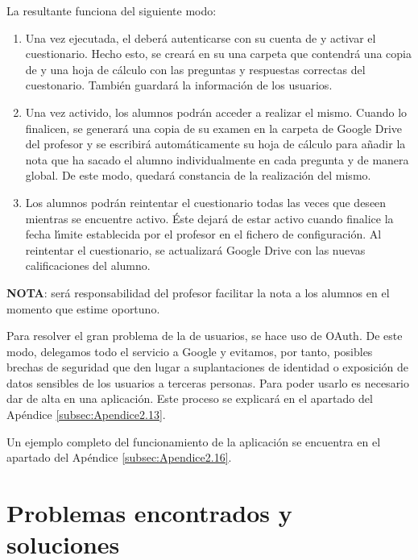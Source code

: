 La  resultante funciona del siguiente modo:
\begin{enumerate}
  \item Una vez ejecutada, el  deber\'a autenticarse con su cuenta de  y activar el cuestionario. Hecho esto, se crear\'a en su  
  una carpeta que contendr\'a una copia de  y una hoja de c\'alculo con las preguntas y respuestas correctas del cuestonario. Tambi\'en guardar\'a la informaci\'on
  de los usuarios. 
  
  \item Una vez activido, los alumnos podr\'an acceder a realizar el mismo. Cuando lo finalicen, se generar\'a una copia de su examen en la carpeta de Google Drive del
  profesor y se escribir\'a autom\'aticamente su hoja de c\'alculo para a\~{n}adir la nota que ha sacado el alumno individualmente en cada pregunta y de manera global.
  De este modo, quedar\'a constancia de la realizaci\'on del mismo.
 
  \item Los alumnos podr\'an reintentar el cuestionario todas las veces que deseen mientras se encuentre activo. \'Este dejar\'a de estar activo cuando finalice la fecha 
  l\'{\i}mite establecida por el profesor en el fichero de configuraci\'on. Al reintentar el cuestionario, se actualizar\'a Google Drive con las nuevas calificaciones
  del alumno.
\end{enumerate}

{\bfseries NOTA}: ser\'a responsabilidad del profesor facilitar la nota a los alumnos en el momento que estime oportuno.
\bigskip

Para resolver el gran problema de la  de usuarios, se hace uso de OAuth. De este modo, delegamos todo el servicio a Google y evitamos, por tanto,
posibles brechas de seguridad que den lugar a suplantaciones de identidad o exposici\'on de datos sensibles de los usuarios a terceras personas. Para poder usarlo
es necesario dar de alta en  una aplicaci\'on. Este proceso se explicar\'a en el apartado del Ap\'endice \ref{subsec:Apendice2.13}.
\bigskip

Un ejemplo completo del funcionamiento de la aplicaci\'on se encuentra en el apartado del Ap\'endice \ref{subsec:Apendice2.16}.
\newpage

\section{Problemas encontrados y soluciones}
\label{5:sec:1}

